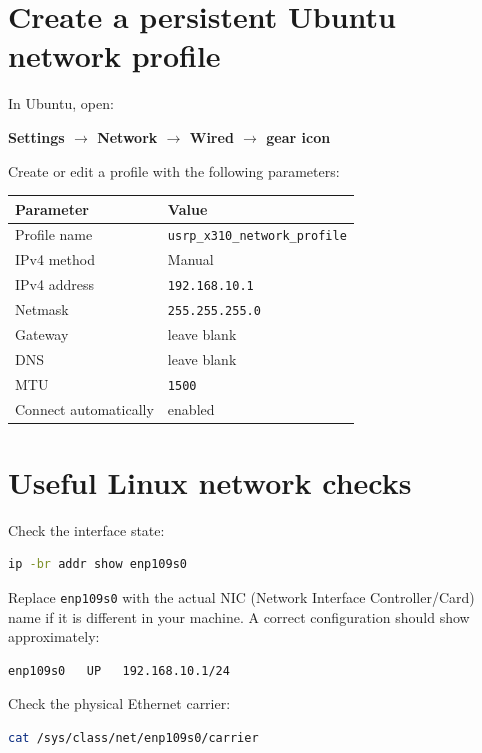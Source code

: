 \documentclass[11pt,a4paper]{article}
\begin{document}
\section{Create a persistent Ubuntu network profile}

In Ubuntu, open:

\begin{center}
\textbf{Settings $\rightarrow$ Network $\rightarrow$ Wired $\rightarrow$ gear icon}
\end{center}

Create or edit a profile with the following parameters:

\begin{center}
\begin{tabular}{ll}
\toprule
Parameter & Value \\
\midrule
Profile name & \texttt{usrp\_x310\_network\_profile} \\
IPv4 method & Manual \\
IPv4 address & \texttt{192.168.10.1} \\
Netmask & \texttt{255.255.255.0} \\
Gateway & leave blank \\
DNS & leave blank \\
MTU & \texttt{1500} \\
Connect automatically & enabled \\
\bottomrule
\end{tabular}
\end{center}

\section{Useful Linux network checks}

Check the interface state:

\begin{lstlisting}[language=bash]
ip -br addr show enp109s0
\end{lstlisting}

Replace \texttt{enp109s0} with the actual NIC (Network Interface Controller/Card) name if it is different in your machine. A correct configuration should show approximately:

\begin{lstlisting}
enp109s0   UP   192.168.10.1/24
\end{lstlisting}

Check the physical Ethernet carrier:

\begin{lstlisting}[language=bash]
cat /sys/class/net/enp109s0/carrier
\end{lstlisting}
\end{document}
